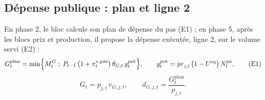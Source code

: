 \documentclass[11pt,a4paper]{article}
\begin{document}
\subsection{Dépense publique : plan et ligne 2}
\label{sec:finances_publiques-depense}
\begin{proposee}
En phase 2, le bloc calcule son plan de dépense du pas (E1) ; en phase 5, après les blocs prix et production, il propose la dépense exécutée, ligne 2, sur le volume servi (E2) :
\begin{equation*}
G^{\mathrm{plan}}_t = \min\Bigl\{M^G_t \;;\; P_{t-1}\,\bigl(1 + \pi^{\ast,\mathrm{pas}}_t\bigr)\,\theta_{G,t}\,y^{\mathrm{pot}}_t\Bigr\}, \qquad y^{\mathrm{pot}}_t = \mathit{pr}_{j,t}\,\bigl(1 - U^{\mathrm{eq}}\bigr)\,N^{\mathrm{pa}}_t , \tag{E1}
\end{equation*}
\begin{equation*}
G_t = p_{j,t}\,v_{G,j,t}, \qquad d_{G,j,t} = \frac{G^{\mathrm{plan}}_t}{p_{j,t}} . \tag{E2}
\end{equation*}


\end{proposee}
\end{document}
